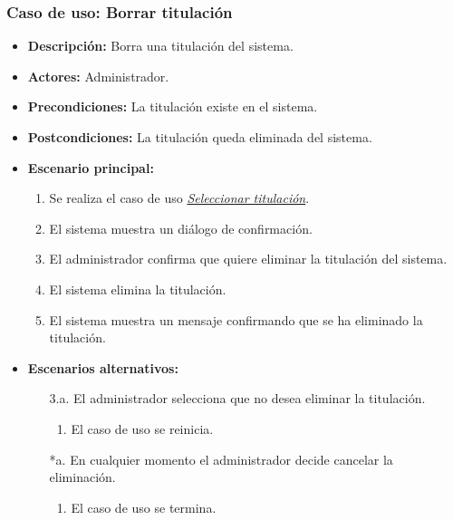 \documentclass{book}
\begin{document}
\subsubsection*{Caso de uso: Borrar titulación}
\begin{itemize}
\item{\bf Descripción:} Borra una titulación del sistema.
\item{\bf Actores:} Administrador.
\item{\bf Precondiciones:} La titulación existe en el sistema.
\item{\bf Postcondiciones:} La titulación queda eliminada del sistema.
\item{\bf Escenario principal:}
	\begin{enumerate}
	\item Se realiza el caso de uso  {\em\hyperref[select_titulacion]{Seleccionar titulación}}.
	\item El sistema muestra un diálogo de confirmación.
	\item El administrador confirma que quiere eliminar la titulación del sistema.
	\item El sistema elimina la titulación.
	\item El sistema muestra un mensaje confirmando que se ha eliminado la titulación.
	\end{enumerate}
\item{\bf Escenarios alternativos:}
	\begin{itemize}
	\item[3.a.] El administrador selecciona que no desea eliminar la titulación.
		\begin{enumerate}
		\item El caso de uso se reinicia.
		\end{enumerate}
	\item[*a.] En cualquier momento el administrador decide cancelar la eliminación.
		\begin{enumerate}
		\item El caso de uso se termina.
		\end{enumerate}
	\end{itemize}
\end{itemize}
\end{document}
